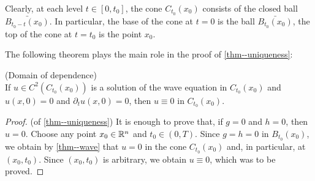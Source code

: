 \documentclass[11pt]{article}
\begin{document}
				Clearly, at each level $t\in[0,t_0]$, the cone $C_{t_0}(x_0)$ consists of the closed ball $\bar{B_{t_0-t}(x_0)}$. In particular, the base of the cone at $t=0$ is the ball $\bar{B_{t_0}(x_0)}$, the top of the cone at $t=t_0$ is the point $x_0$.

				The following theorem plays the main role in the proof of \autoref{thm--uniqueness}:

				\begin{thm}\label{thm--wave}
					(Domain of dependence)\\
					If $u\in C^2(C_{t_0}(x_0))$ is a solution of the wave equation in $C_{t_0}(x_0)$ and $u(x,0)=0$ and $\partial_t u(x,0)=0$, then $u\equiv0$ in $C_{t_0}(x_0)$.
				\end{thm}
                \begin{proof}
					(of \autoref{thm--uniqueness}) It is enough to prove that, if $g=0$ and $h=0$, then $u=0$. Choose any point $x_0\in\mathbb{R}^n$ and $t_0\in(0,T)$. Since $g=h=0$ in $B_{t_0}(x_0)$, we obtain by \autoref{thm--wave} that $u=0$ in the cone $C_{t_0}(x_0)$ and, in particular, at $(x_0,t_0)$. Since $(x_0,t_0)$ is arbitrary, we obtain $u\equiv0$, which was to be proved.
				\end{proof}
\end{document}
